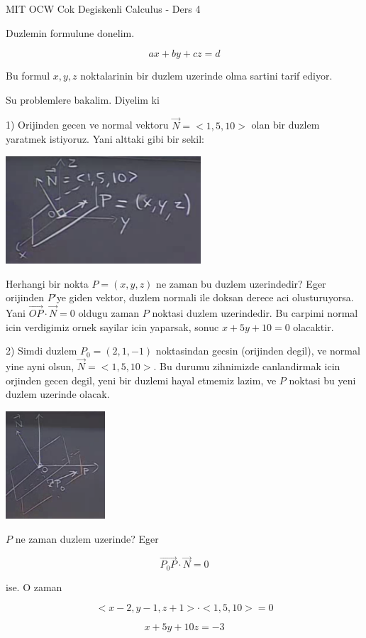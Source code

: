 \documentclass[12pt,fleqn]{article}
\begin{document}
MIT OCW Cok Degiskenli Calculus - Ders 4

Duzlemin formulune donelim. 

\[ ax + by + cz = d \]

Bu formul $x,y,z$ noktalarinin bir duzlem uzerinde olma sartini tarif
ediyor. 

Su problemlere bakalim. Diyelim ki 

1) Orijinden gecen ve normal vektoru $\vec{N} = <1,5,10>$ olan bir duzlem
yaratmek istiyoruz. Yani alttaki gibi bir sekil:

\includegraphics[height=4cm]{4_1.png}

Herhangi bir nokta $P = (x,y,z)$  ne zaman bu duzlem uzerindedir? Eger
orijinden $P$'ye giden vektor, duzlem normali ile doksan derece aci
olusturuyorsa. Yani $\vec{OP} \cdot \vec{N} = 0$ oldugu zaman $P$ noktasi
duzlem uzerindedir. Bu carpimi normal icin verdigimiz ornek sayilar icin
yaparsak, sonuc $x+5y+10 = 0$ olacaktir. 

2) Simdi duzlem $P_0 = (2,1,-1)$ noktasindan gecsin (orijinden degil), ve
normal yine ayni olsun, $\vec{N} = <1,5,10>$. Bu durumu zihnimizde
canlandirmak icin orjinden gecen degil, yeni bir duzlemi hayal etmemiz
lazim, ve $P$ noktasi bu yeni duzlem uzerinde olacak. 

\includegraphics[height=4cm]{4_2.png}

$P$ ne zaman duzlem uzerinde? Eger 

\[ \vec{P_0P} \cdot \vec{N} = 0 \]

ise. O zaman 

\[ <x-2, y-1, z+1> \cdot <1,5,10> = 0 \]

\[ x+5y + 10z = -3 \]
\end{document}
